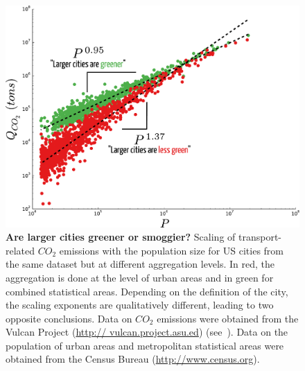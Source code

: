 \begin{figure}[!h]
	\centering
	\includegraphics[width=\textwidth]{gfx/chapter-scaling/lost_smog.pdf}
	\caption{ {\bf Are larger cities greener or smoggier?} Scaling of transport-related $CO_2$
emissions with the population size for US cities from the same dataset but at different aggregation
levels. In red, the aggregation is done at the level of urban areas and in green for combined statistical
areas. Depending on the definition of the city, the scaling exponents are qualitatively different, leading
to two opposite conclusions. Data on $CO_2$ emissions were obtained from the Vulcan Project (\url{http://
vulcan.project.asu.ed}) (see~\cite{Fragkias:2013,Oliveira:2014}). Data on the population of urban areas and
metropolitan statistical areas were obtained from the Census Bureau (\protect\url{http://www.census.org}). \label{fig}}
\end{figure}

